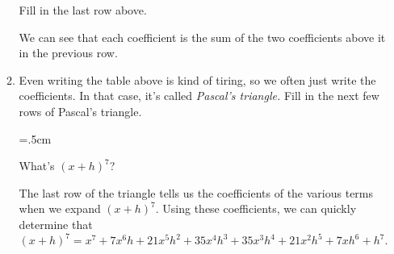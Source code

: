 \documentclass{article}
\makeatletter
\newcommand\binomialCoefficient[2]{%
  \c@pgf@counta=#1%
  \c@pgf@countb=#2%
  \c@pgf@countc=\c@pgf@counta%
  \advance\c@pgf@countc by-\c@pgf@countb%
  \ifnum\c@pgf@countb>\c@pgf@countc%
  \c@pgf@countb=\c@pgf@countc%
  \fi%
  \c@pgf@countc=1%
  \c@pgf@countd=0%
  \pgfmathloop%
  \ifnum\c@pgf@countd<\c@pgf@countb%
  \multiply\c@pgf@countc by\c@pgf@counta%
  \advance\c@pgf@counta by-1%
  \advance\c@pgf@countd by1%
  \divide\c@pgf@countc by\c@pgf@countd%
  \repeatpgfmathloop%
  \the\c@pgf@countc%
}
\makeatother
\begin{document}
\begin{enumerate}
\begin{enumerate}
    \begin{problem}
      Fill in the last row above. 
    \end{problem}

    \begin{solution}
      We can see that each coefficient is the sum of the two coefficients above it
      in the previous row.
    \end{solution}

  \item
    \begin{problem}
      Even writing the table above is kind of tiring, so we often just write the coefficients. In that case, it's called \emph{Pascal's triangle.} Fill in the next few rows of Pascal's triangle.
    \end{problem}

    {
      \newdimen\R
      \R=.5cm
      \newcommand\mycolor{white}
    }

    \begin{problem}[0.25in]
      What's $(x + h)^7$?
    \end{problem}

    \begin{solution}
      The last row of the triangle tells us the coefficients of the various terms
      when we expand $(x+h)^7$. Using these coefficients, we can quickly determine that
      \[(x+h)^7 = x^7 + 7x^6h + 21x^5h^2 + 35x^4h^3 + 35x^3h^4 + 21x^2h^5 + 7xh^6 + h^7.\]
    \end{solution}


\end{enumerate}
\end{enumerate}
\end{document}
